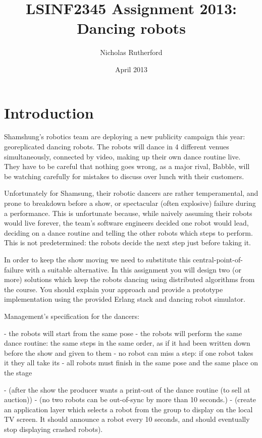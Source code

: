\documentclass[a4paper]{article}
\title{LSINF2345 Assignment 2013: Dancing robots}
\author{Nicholas Rutherford}
\date{April 2013}
\begin{document}
\lstset{language=erlang}

\ifpdf
{}
\else
{}
\fi

\maketitle


\section{Introduction}

Shamshung's robotics team are deploying a new publicity campaign this year:
georeplicated dancing robots. The robots will dance in 4 different venues
simultaneously, connected by video, making up their own dance routine live.
They have to be careful that nothing goes wrong, as a major rival,
Babble, will be watching carefully for mistakes to discuss over lunch with
their customers.

Unfortunately for Shamsung, their robotic dancers are rather temperamental,
and prone to breakdown before a show, or spectacular (often explosive) failure
during a performance. This is unfortunate because, while naively assuming
their robots would live forever, the team's software engineers decided one
robot would lead, deciding on a dance routine and telling the other robots
which steps to perform. This is not predetermined: the robots decide the next
step just before taking it.

In order to keep the show moving we need to substitute this
central-point-of-failure with a suitable alternative. In this assignment you
will design two (or more) solutions which keep the robots dancing using
distributed algorithms from the course. You should explain your approach and
provide a prototype implementation using the provided Erlang stack and
dancing robot simulator.

Management's specification for the dancers:

  - the robots will start from the same pose
  - the robots will perform the same dance routine: the same steps in the same order,
    as if it had been written down before the show and given to them
  - no robot can miss a step: if one robot takes it they all take its
  - all robots must finish in the same pose and the same place on the stage

  - (after the show the producer wants a print-out of the dance routine (to sell at auction))
  - (no two robots can be out-of-sync by more than 10 seconds.)
  - (create an application layer which selects a robot from the group to 
      display on the local TV screen. It should announce a robot every 10 seconds, 
      and should eventually stop displaying crashed robots).
\end{document}
